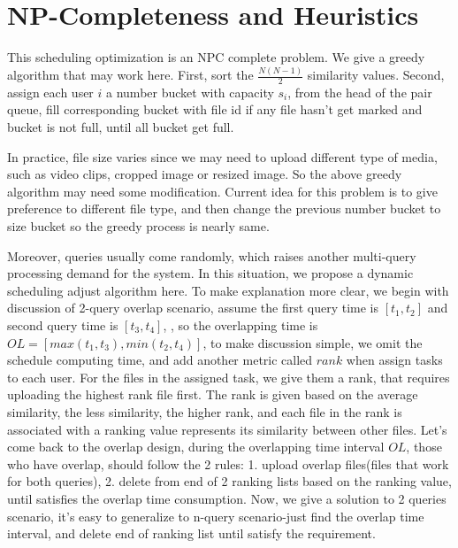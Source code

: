 
\section{NP-Completeness and Heuristics}
\label{sec:heuri}

This scheduling optimization is an NPC complete problem. We give a greedy algorithm that may work here. First, sort the $\frac{N(N-1)}{2}$ similarity values. Second, assign each user $i$ a number bucket with capacity $s_{i}$, from the head of the pair queue, fill corresponding bucket with file id if any file hasn't get marked and bucket is not full, until all bucket get full. 

In practice, file size varies since we may need to upload different type of media, such as video clips, cropped image or resized image. So the above greedy algorithm may need some modification. Current idea for this problem is to give preference to different file type, and then change the previous number bucket to size bucket so the greedy process is nearly same.

Moreover, queries usually come randomly, which raises another multi-query processing demand for the system. In this situation, we propose a dynamic scheduling adjust algorithm here. To make explanation more clear, we begin with discussion of 2-query overlap scenario, assume the first query time is $[t_{1},t_{2}]$ and second query time is $[t_{3},t_{4}]$, , so the overlapping time is $OL=[max(t_{1},t_{3}),min(t_{2},t_{4})]$, to make discussion simple, we omit the schedule computing time, and add another metric called $rank$ when assign tasks to each user. For the files in the assigned task, we give them a rank, that requires uploading the highest rank file first. The rank is given based on the average similarity, the less similarity, the higher rank, and each file in the rank is associated with a ranking value represents its similarity between other files. Let's come back to the overlap design, during the overlapping time interval $OL$, those who have overlap, should follow the 2 rules: 1. upload overlap files(files that work for both queries), 2. delete from end of 2 ranking lists based on the ranking value, until satisfies  the overlap time consumption. Now, we give a solution to 2 queries scenario, it's easy to generalize to n-query scenario-just find the overlap time interval, and delete end of ranking list until satisfy the requirement. 